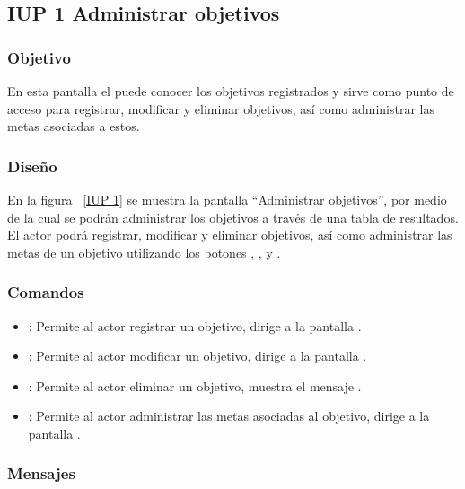 \subsection{IUP 1 Administrar objetivos}
\subsubsection{Objetivo}
	
	En esta pantalla el  puede conocer los objetivos registrados y sirve
	como punto de acceso para registrar, modificar y eliminar objetivos, así como administrar las metas asociadas a estos.
	

\subsubsection{Diseño}

    En la figura ~\ref{IUP 1} se muestra la pantalla ``Administrar objetivos'', por medio de la cual 
    se podrán administrar los objetivos a través de una tabla de resultados.
    El actor podrá registrar, modificar y eliminar objetivos, así como administrar las metas de 
    un objetivo utilizando los botones , \botAdm, \botEdit y \botKo. \\



\subsubsection{Comandos}
\begin{itemize}
	\item {}: Permite al actor registrar un objetivo, dirige a la pantalla .
	\item {}: Permite al actor modificar un objetivo, dirige a la pantalla .
	\item {}: Permite al actor eliminar un objetivo, muestra el mensaje .
 	\item {}: Permite al actor administrar las metas asociadas al objetivo, dirige a la pantalla .
\end{itemize}

\subsubsection{Mensajes}

